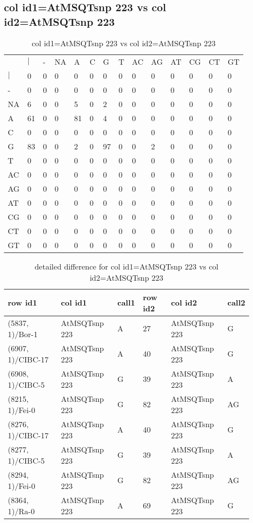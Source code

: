 \subsection{col id1=AtMSQTsnp 223 vs col id2=AtMSQTsnp 223}
\begin{center}
\begin{longtable}{|l|l|l|l|l|l|l|l|l|l|l|l|l|l|}
\caption{col id1=AtMSQTsnp 223 vs col id2=AtMSQTsnp 223} \label{table_dm788}\\
\hline
\\
\hline
&$|$&-&NA&A&C&G&T&AC&AG&AT&CG&CT&GT\\
$|$&0&0&0&0&0&0&0&0&0&0&0&0&0\\
-&0&0&0&0&0&0&0&0&0&0&0&0&0\\
NA&6&0&0&5&0&2&0&0&0&0&0&0&0\\
A&61&0&0&81&0&4&0&0&0&0&0&0&0\\
C&0&0&0&0&0&0&0&0&0&0&0&0&0\\
G&83&0&0&2&0&97&0&0&2&0&0&0&0\\
T&0&0&0&0&0&0&0&0&0&0&0&0&0\\
AC&0&0&0&0&0&0&0&0&0&0&0&0&0\\
AG&0&0&0&0&0&0&0&0&0&0&0&0&0\\
AT&0&0&0&0&0&0&0&0&0&0&0&0&0\\
CG&0&0&0&0&0&0&0&0&0&0&0&0&0\\
CT&0&0&0&0&0&0&0&0&0&0&0&0&0\\
GT&0&0&0&0&0&0&0&0&0&0&0&0&0\\
\hline
\end{longtable}
\end{center}

\begin{center}
\begin{longtable}{|l|l|l|l|l|l|}
\caption{detailed difference for col id1=AtMSQTsnp 223 vs col id2=AtMSQTsnp 223} \label{table_dm789}\\
\hline
row id1&col id1&call1&row id2&col id2&call2\\
\hline
(5837, 1)/Bor-1&AtMSQTsnp 223&A&27&AtMSQTsnp 223&G\\
(6907, 1)/CIBC-17&AtMSQTsnp 223&A&40&AtMSQTsnp 223&G\\
(6908, 1)/CIBC-5&AtMSQTsnp 223&G&39&AtMSQTsnp 223&A\\
(8215, 1)/Fei-0&AtMSQTsnp 223&G&82&AtMSQTsnp 223&AG\\
(8276, 1)/CIBC-17&AtMSQTsnp 223&A&40&AtMSQTsnp 223&G\\
(8277, 1)/CIBC-5&AtMSQTsnp 223&G&39&AtMSQTsnp 223&A\\
(8294, 1)/Fei-0&AtMSQTsnp 223&G&82&AtMSQTsnp 223&AG\\
(8364, 1)/Ra-0&AtMSQTsnp 223&A&69&AtMSQTsnp 223&G\\
\hline
\end{longtable}
\end{center}

